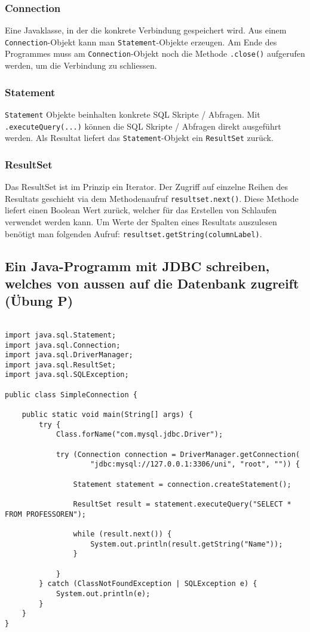 \subsubsection{Connection}
Eine Javaklasse, in der die konkrete Verbindung gespeichert wird. Aus einem \verb|Connection|-Objekt kann man \verb|Statement|-Objekte erzeugen. Am Ende des Programmes muss am \verb|Connection|-Objekt noch die Methode \verb|.close()| aufgerufen werden, um die Verbindung zu schliessen.
\subsubsection{Statement}
\verb|Statement| Objekte beinhalten konkrete SQL Skripte / Abfragen. Mit \verb|.executeQuery(...)| können die SQL Skripte / Abfragen direkt ausgeführt werden. Als Resultat liefert das \verb|Statement|-Objekt ein \verb|ResultSet| zurück.

\subsubsection{ResultSet}
Das ResultSet ist im Prinzip ein Iterator. Der Zugriff auf einzelne Reihen des Resultats geschieht via dem Methodenaufruf \verb|resultset.next()|. Diese Methode liefert einen Boolean Wert zurück, welcher für das Erstellen von Schlaufen verwendet werden kann. Um Werte der Spalten eines Resultats auszulesen benötigt man folgenden Aufruf: \verb|resultset.getString(columnLabel)|. 

\subsection{Ein Java-Programm mit JDBC schreiben, welches von aussen auf die Datenbank zugreift (Übung P)}

\begin{lstlisting}[caption={JDBC Beispielprogramm},label=lst:jdbc_sample]

import java.sql.Statement;
import java.sql.Connection;
import java.sql.DriverManager;
import java.sql.ResultSet;
import java.sql.SQLException;

public class SimpleConnection {

    public static void main(String[] args) {
        try {
            Class.forName("com.mysql.jdbc.Driver");

            try (Connection connection = DriverManager.getConnection(
                    "jdbc:mysql://127.0.0.1:3306/uni", "root", "")) {

                Statement statement = connection.createStatement();

                ResultSet result = statement.executeQuery("SELECT * FROM PROFESSOREN");

                while (result.next()) {
                    System.out.println(result.getString("Name"));
                }

            }
        } catch (ClassNotFoundException | SQLException e) {
            System.out.println(e);
        }
    }
}
\end{lstlisting}


